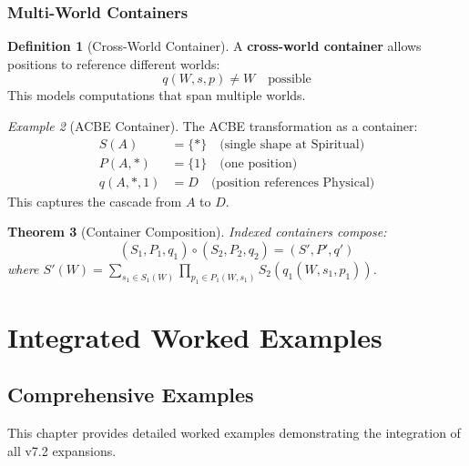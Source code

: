 \documentclass[11pt,twoside,openright]{book}
\theoremstyle{definition}
\newtheorem{definition}{Definition}[chapter]
\theoremstyle{plain}
\newtheorem{theorem}[definition]{Theorem}
\theoremstyle{remark}
\newtheorem{example}[definition]{Example}
\newcommand{\vnewtwo}{\textbf{v7.2 New}}
\begin{document}
\section{Multi-World Containers}

\begin{definition}[Cross-World Container]
\label{def:cross-world}
A \textbf{cross-world container} allows positions to reference different worlds:
\[
q(W, s, p) \neq W \quad \text{possible}
\]
This models computations that span multiple worlds.
\end{definition}

\begin{example}[ACBE Container]
\label{ex:acbe-container}
The ACBE transformation as a container:
\begin{align}
S(A) &= \{*\} \quad \text{(single shape at Spiritual)} \\
P(A, *) &= \{1\} \quad \text{(one position)} \\
q(A, *, 1) &= D \quad \text{(position references Physical)}
\end{align}
This captures the cascade from $A$ to $D$.
\end{example}

\begin{theorem}[Container Composition]
\label{thm:container-comp}
Indexed containers compose:
\[
(S_1, P_1, q_1) \circ (S_2, P_2, q_2) = (S', P', q')
\]
where $S'(W) = \sum_{s_1 \in S_1(W)} \prod_{p_1 \in P_1(W, s_1)} S_2(q_1(W, s_1, p_1))$.
\end{theorem}

\part{Integrated Worked Examples}

\chapter{Comprehensive Examples}
\label{ch:examples}

\begin{tcolorbox}[colback=green!5!white,colframe=green!75!black,title=\vnewtwo]
This chapter provides detailed worked examples demonstrating the integration of all v7.2 expansions.
\end{tcolorbox}
\end{document}
